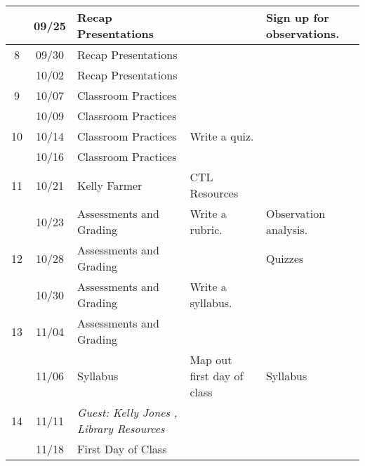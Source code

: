 \begin{longtable}{ |c|c|p{10em}|p{10em}|p{10em}| }
    & 09/25 &  {Recap Presentations} & {} & {Sign up for observations.} \\ \hline

  8 & 09/30 & {Recap Presentations}
            & {} 
            & {} \\ \hline

    & 10/02 & {Recap Presentations} 
            & {} & \\ \hline

  9 & 10/07  & {Classroom Practices}
             &
             & {} \\ \hline

     & 10/09 & {Classroom Practices}
             & {}
             & {} \\ \hline

  10 & 10/14 & {Classroom Practices} 
             & {Write a quiz.}
             & {} \\ \hline

     & 10/16 & {Classroom Practices}
             & {}
             & {} \\ \hline

  11 & 10/21  & {Kelly Farmer} %
              & {CTL Resources} 
              & {} \\ \hline

     & 10/23  & {Assessments and Grading}
              & {Write a rubric.}
              & {Observation analysis.} \\ \hline

  12 & 10/28 & {Assessments and Grading} 
             & {}  
             & {Quizzes} \\ \hline

     & 10/30 & {Assessments and Grading}
             & {Write a syllabus.}
             & {} \\ \hline

  13 & 11/04 & {Assessments and Grading} 
             & 
             & {} \\ \hline %

     & 11/06 & {Syllabus} 
             & {Map out first day of class}
             & {Syllabus} \\ \hline %

  14 & 11/11 & \textit{Guest: Kelly Jones , Library Resources}  %
             & 
             & {} \\ \hline %


     & 11/18 & {First Day of Class}
             & 
             & \\ \hline


\end{longtable}
